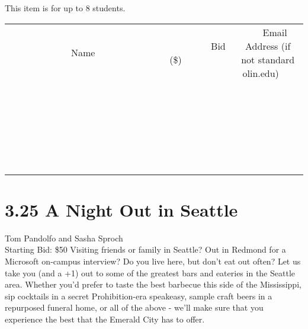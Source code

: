 \documentclass[11pt]{article}
\begin{document}
This item is for up to 8 students.
\\[6ex]
\begin{tabular}{c c c}
~~~~~~~~~~~~~Name~~~~~~~~~~~~~ & ~~~~~~~~~Bid (\$)~~~~~~~~~  & ~~~Email Address (if not standard olin.edu)~~~\\
 & & \\
\hline
 & & \\
\hline
 & & \\
\hline
 & & \\
\hline
 & & \\
\hline
 & & \\
\hline
 & & \\
\hline
 & & \\
\hline
 & & \\
\hline
 & & \\
\hline
 & & \\
\hline
 & & \\
\hline
 & & \\
\hline
 & & \\
\hline
 & & \\
\hline
 & & \\
\hline
 & & \\
\hline
 & & \\
\hline
 & & \\
\hline
 & & \\
\hline
 & & \\
\hline
 & & \\
\hline
 & & \\
\hline
 & & \\
\hline
 & & \\
\hline
 & & \\
\hline
\end{tabular}
\newpage
\section*{3.25 A Night Out in Seattle}
Tom Pandolfo and Sasha Sproch
\\
Starting Bid: \$50
\newline
Visiting friends or family in Seattle? Out in Redmond for a Microsoft on-campus interview? Do you live here, but don't eat out often? Let us take you (and a +1) out to some of the greatest bars and eateries in the Seattle area. Whether you'd prefer to taste the best barbecue this side of the Mississippi, sip cocktails in a secret Prohibition-era speakeasy, sample craft beers in a repurposed funeral home, or all of the above - we'll make sure that you experience the best that the Emerald City has to offer.
\end{document}

